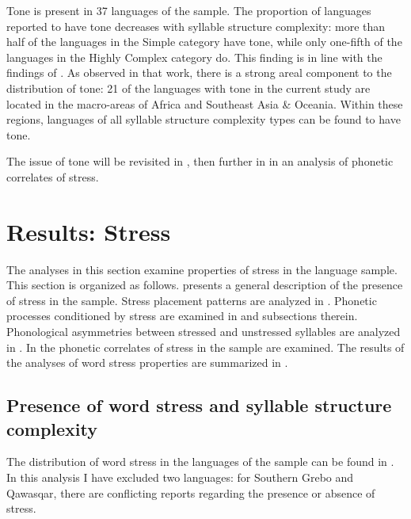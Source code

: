   Tone is present in 37 languages of the sample. The proportion of languages reported to have tone decreases with syllable structure complexity: more than half of the languages in the Simple category have tone, while only one-fifth of the languages in the Highly Complex category do. This finding is in line with the findings of \citet{Maddieson2013d}. As observed in that work, there is a strong areal component to the distribution of tone: 21 of the languages with tone in the current study are located in the macro-areas of Africa and Southeast Asia \& Oceania. Within these regions, languages of all syllable structure complexity types can be found to have tone.

  The issue of tone will be revisited in , then further in  in an analysis of phonetic correlates of stress.

\section{Results: Stress}\label{sec:5.4}

  The analyses in this section examine properties of stress in the language sample. This section is organized as follows.  presents a general description of the presence of stress in the sample. Stress placement patterns are analyzed in . Phonetic processes conditioned by stress are examined in  and subsections therein. Phonological asymmetries between stressed and unstressed syllables are analyzed in . In  the phonetic correlates of stress in the sample are examined. The results of the analyses of word stress properties are summarized in .

\subsection{Presence of word stress and syllable structure complexity}\label{sec:5.4.1}

  The distribution of word stress in the languages of the sample can be found in . In this analysis I have excluded two languages: for Southern Grebo and Qawasqar, there are conflicting reports regarding the presence or absence of stress.

